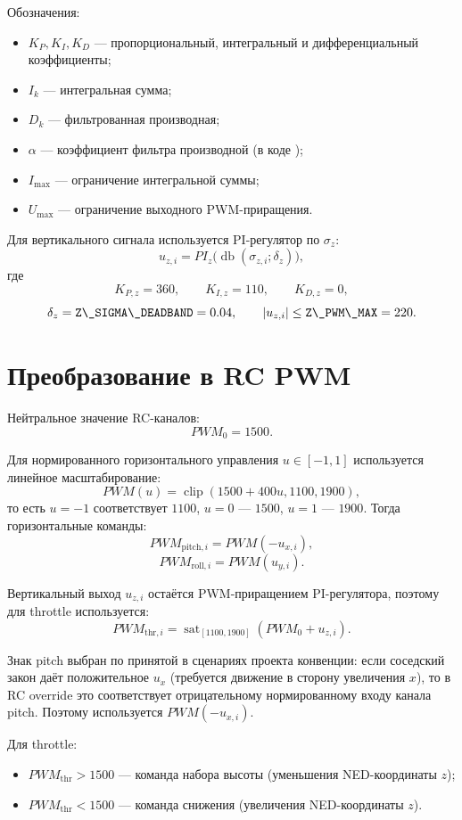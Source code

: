 \documentclass[a4paper,11pt]{article}
\newcommand{\code}[1]{\texttt{\detokenize{#1}}}
\newcommand{\sat}{\operatorname{sat}}
\newcommand{\clip}{\operatorname{clip}}
\begin{document}
Обозначения:
\begin{itemize}
  \item $K_P,K_I,K_D$ --- пропорциональный, интегральный и дифференциальный
  коэффициенты;
  \item $I_k$ --- интегральная сумма;
  \item $D_k$ --- фильтрованная производная;
  \item $\alpha$ --- коэффициент фильтра производной
  (в коде \code{derivative\_alpha});
  \item $I_{\max}$ --- ограничение интегральной суммы;
  \item $U_{\max}$ --- ограничение выходного PWM-приращения.
\end{itemize}

Для вертикального сигнала используется PI-регулятор по $\sigma_z$:
\[
  u_{z,i}=PI_z\bigl(\operatorname{db}(\sigma_{z,i};\delta_z)\bigr),
\]
где
\[
  K_{P,z}=360,\qquad K_{I,z}=110,\qquad K_{D,z}=0,
\]
\[
  \delta_z=\text{\code{Z\_SIGMA\_DEADBAND}}=0.04,\qquad
  |u_{z,i}|\le \text{\code{Z\_PWM\_MAX}}=220.
\]

\section{Преобразование в RC PWM}

Нейтральное значение RC-каналов:
\[
  PWM_0 = 1500.
\]

Для нормированного горизонтального управления $u\in[-1,1]$ используется
линейное масштабирование:
\[
  PWM(u)=\clip(1500+400u,1100,1900),
\]
то есть $u=-1$ соответствует $1100$, $u=0$ --- $1500$, $u=1$ --- $1900$.
Тогда горизонтальные команды:
\[
  PWM_{\mathrm{pitch},i}=PWM(-u_{x,i}),
\]
\[
  PWM_{\mathrm{roll},i}=PWM(u_{y,i}).
\]

Вертикальный выход $u_{z,i}$ остаётся PWM-приращением PI-регулятора, поэтому
для throttle используется:
\[
  PWM_{\mathrm{thr},i}
  =
  \sat_{[1100,1900]}(PWM_0+u_{z,i}).
\]

Знак pitch выбран по принятой в сценариях проекта конвенции:
если соседский закон даёт положительное $u_x$ (требуется движение в сторону
увеличения $x$), то в RC override это соответствует отрицательному
нормированному входу канала pitch. Поэтому используется $PWM(-u_{x,i})$.

Для throttle:
\begin{itemize}
  \item $PWM_{\mathrm{thr}}>1500$ --- команда набора высоты
  (уменьшения NED-координаты $z$);
  \item $PWM_{\mathrm{thr}}<1500$ --- команда снижения
  (увеличения NED-координаты $z$).
\end{itemize}
\end{document}
